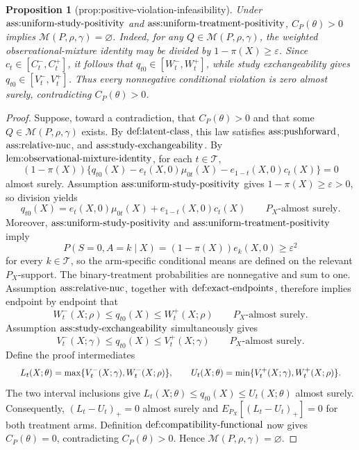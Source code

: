 \documentclass{article}
\newtheorem{proposition}{Proposition}
\begin{document}
\begin{proposition}[prop:positive-violation-infeasibility]\label{prop:positive-violation-infeasibility}
Under \(\textup{ass:uniform-study-positivity}\) and \(\textup{ass:uniform-treatment-positivity}\), \(C_P(\theta)>0\) implies \(\mathcal M(P,\rho,\gamma)=\varnothing\). Indeed, for any \(Q\in\mathcal M(P,\rho,\gamma)\), the weighted observational-mixture identity may be divided by \(1-\pi(X)\ge\varepsilon\). Since \(c_t\in[C_t^-,C_t^+]\), it follows that \(q_{t0}\in[W_t^-,W_t^+]\), while study exchangeability gives \(q_{t0}\in[V_t^-,V_t^+]\). Thus every nonnegative conditional violation is zero almost surely, contradicting \(C_P(\theta)>0\).
\end{proposition}
\begin{proof}
Suppose, toward a contradiction, that \(C_P(\theta)>0\) and that some \(Q\in\mathcal M(P,\rho,\gamma)\) exists. By \(\textup{def:latent-class}\), this law satisfies \(\textup{ass:pushforward}\), \(\textup{ass:relative-nuc}\), and \(\textup{ass:study-exchangeability}\). By \(\textup{lem:observational-mixture-identity}\), for each \(t\in\mathcal T\),\[(1-\pi(X))\{q_{t0}(X)-e_t(X,0)\mu_{0t}(X)-e_{1-t}(X,0)c_t(X)\}=0\]almost surely. Assumption \(\textup{ass:uniform-study-positivity}\) gives \(1-\pi(X)\ge\varepsilon>0\), so division yields\[q_{t0}(X)=e_t(X,0)\mu_{0t}(X)+e_{1-t}(X,0)c_t(X)\qquad P_X\text{-almost surely}.\]Moreover, \(\textup{ass:uniform-study-positivity}\) and \(\textup{ass:uniform-treatment-positivity}\) imply\[P(S=0,A=k\mid X)=(1-\pi(X))e_k(X,0)\ge\varepsilon^2\]for every \(k\in\mathcal T\), so the arm-specific conditional means are defined on the relevant \(P_X\)-support. The binary-treatment probabilities are nonnegative and sum to one. Assumption \(\textup{ass:relative-nuc}\), together with \(\textup{def:exact-endpoints}\), therefore implies endpoint by endpoint that\[W_t^-(X;\rho)\le q_{t0}(X)\le W_t^+(X;\rho)\qquad P_X\text{-almost surely}.\]Assumption \(\textup{ass:study-exchangeability}\) simultaneously gives\[V_t^-(X;\gamma)\le q_{t0}(X)\le V_t^+(X;\gamma)\qquad P_X\text{-almost surely}.\]Define the proof intermediates\[
\makebox[\linewidth][c]{\resizebox{0.98\linewidth}{!}{\par\noindent \makebox[\linewidth][c]{\resizebox{0.98\linewidth}{!}{\(\displaystyle \displaystyle L_t(X;\theta)=\max\{V_t^-(X;\gamma),W_t^-(X;\rho)\},\qquad U_t(X;\theta)=\min\{V_t^+(X;\gamma),W_t^+(X;\rho)\}.\)}}\par\noindent}}
\]The two interval inclusions give \(L_t(X;\theta)\le q_{t0}(X)\le U_t(X;\theta)\) almost surely. Consequently, \((L_t-U_t)_+=0\) almost surely and \(E_{P_X}[(L_t-U_t)_+]=0\) for both treatment arms. Definition \(\textup{def:compatibility-functional}\) now gives \(C_P(\theta)=0\), contradicting \(C_P(\theta)>0\). Hence \(\mathcal M(P,\rho,\gamma)=\varnothing\).
\end{proof}
\end{document}
